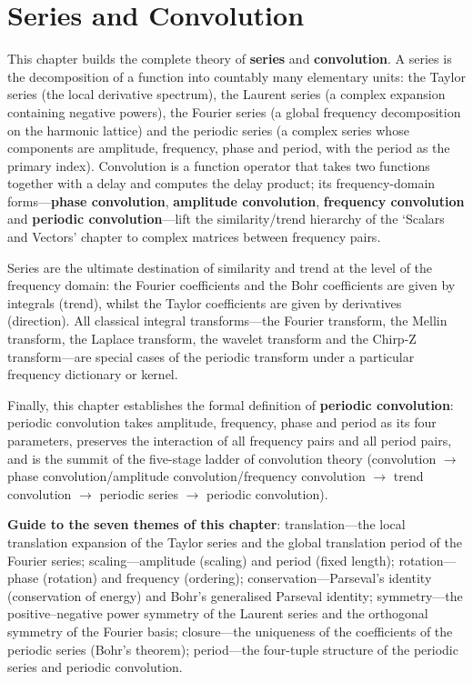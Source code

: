 \chapter{Series and Convolution}
\label{chap:series_conv}

\begin{remark}\label{rem:series_chapter_positioning}
This chapter builds the complete theory of \textbf{series} and \textbf{convolution}. A series is the decomposition of a function into countably many elementary units: the Taylor series (the local derivative spectrum), the Laurent series (a complex expansion containing negative powers), the Fourier series (a global frequency decomposition on the harmonic lattice) and the periodic series (a complex series whose components are amplitude, frequency, phase and period, with the period as the primary index). Convolution is a function operator that takes two functions together with a delay and computes the delay product; its frequency-domain forms---\textbf{phase convolution}, \textbf{amplitude convolution}, \textbf{frequency convolution} and \textbf{periodic convolution}---lift the similarity/trend hierarchy of the `Scalars and Vectors' chapter to complex matrices between frequency pairs.

Series are the ultimate destination of similarity and trend at the level of the frequency domain: the Fourier coefficients and the Bohr coefficients are given by integrals (trend), whilst the Taylor coefficients are given by derivatives (direction). All classical integral transforms---the Fourier transform, the Mellin transform, the Laplace transform, the wavelet transform and the Chirp-Z transform---are special cases of the periodic transform under a particular frequency dictionary or kernel.

Finally, this chapter establishes the formal definition of \textbf{periodic convolution}: periodic convolution takes amplitude, frequency, phase and period as its four parameters, preserves the interaction of all frequency pairs and all period pairs, and is the summit of the five-stage ladder of convolution theory (convolution $\to$ phase convolution/amplitude convolution/frequency convolution $\to$ trend convolution $\to$ periodic series $\to$ periodic convolution).

\textbf{Guide to the seven themes of this chapter}: translation---the local translation expansion of the Taylor series and the global translation period of the Fourier series; scaling---amplitude (scaling) and period (fixed length); rotation---phase (rotation) and frequency (ordering); conservation---Parseval's identity (conservation of energy) and Bohr's generalised Parseval identity; symmetry---the positive--negative power symmetry of the Laurent series and the orthogonal symmetry of the Fourier basis; closure---the uniqueness of the coefficients of the periodic series (Bohr's theorem); period---the four-tuple structure of the periodic series and periodic convolution.
\end{remark}

